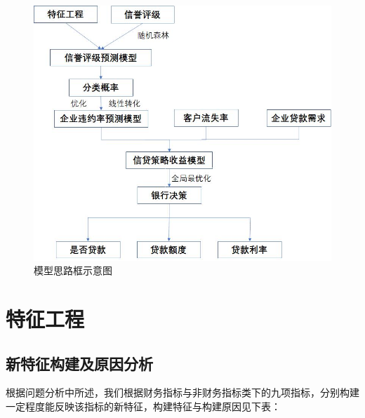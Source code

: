 \documentclass[bwprint]{cumcm}
\begin{document}
\newpage
\begin{figure}[h]%
	\centering  %
	\includegraphics[width=0.8\linewidth]{figures/figure1.jpg}  %
	\caption{模型思路框示意图}  %
	\label{fig:mcmthesis-logo}   %
\end{figure}

\newpage

\section{\heiti 特征工程}
\subsection{\heiti 新特征构建及原因分析}
  \indent 根据问题分析中所述，我们根据财务指标与非财务指标类下的九项指标，分别构建一定程度能反映该指标的新特征，构建特征与构建原因见下表：
\end{document}
